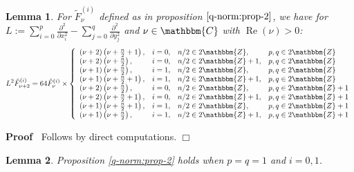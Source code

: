 \documentclass{article}
\newcommand{\assign}{:=}
\newcommand{\tmop}[1]{\ensuremath{\operatorname{#1}}}
\newenvironment{proof}{\noindent\textbf{Proof\ }}{\hspace*{\fill}$\Box$\medskip}
\numberwithin{definition}{section}
\newtheorem{lemma}{Lemma}
\numberwithin{lemma}{section}
\numberwithin{proposition}{section}
{\theorembodyfont{\rmfamily}\newtheorem{remark}{Remark}
\numberwithin{remark}{section}
}
\begin{document}
\begin{lemma}
  \label{lem-normalized-eq}For $\tilde{F}_{\nu}^{( i)}$ defined as in
  proposition $\ref{q-norm:prop-2}$, we have for $L \assign \sum_{i = 0}^p
  \frac{\partial^2}{\partial x_i^2} - \sum_{j = 0}^q
  \frac{\partial^2}{\partial y_j^2}$ and $\nu \in \mathbbm{C}$ with $\tmop{Re}
  ( \nu) > 0$:
  \[ L^2 \tilde{F}_{\nu + 2}^{( i)} = 64 \tilde{F}^{( i)}_{\nu} \times \left\{
     \begin{array}{llll}
       ( \nu + 2) \left( \nu + \frac{n}{2} + 1 \right), & i = 0, & n / 2 \in
       2\mathbbm{Z}, & p, q \in 2\mathbbm{Z}\\
       ( \nu + 2) \left( \nu + \frac{n}{2} \right), & i = 0, & n / 2 \in
       2\mathbbm{Z}+ 1, & p, q \in 2\mathbbm{Z}\\
       ( \nu + 1) \left( \nu + \frac{n}{2} \right), & i = 1, & n / 2 \in
       2\mathbbm{Z}, & p, q \in 2\mathbbm{Z}\\
       ( \nu + 1) \left( \nu + \frac{n}{2} + 1 \right), & i = 1, & n / 2 \in
       2\mathbbm{Z}+ 1, & p, q \in 2\mathbbm{Z}\\
       ( \nu + 2) \left( \nu + \frac{n}{2} \right), & i = 0, & n / 2 \in
       2\mathbbm{Z}, & p, q \in 2\mathbbm{Z}+ 1\\
       ( \nu + 2) \left( \nu + \frac{n}{2} + 1 \right), & i = 0, & n / 2 \in
       2\mathbbm{Z}+ 1, & p, q \in 2\mathbbm{Z}+ 1\\
       ( \nu + 1) \left( \nu + \frac{n}{2} + 1 \right), & i = 1, & n / 2 \in
       2\mathbbm{Z}, & p, q \in 2\mathbbm{Z}+ 1\\
       ( \nu + 1) \left( \nu + \frac{n}{2} \right), & i = 1, & n / 2 \in
       2\mathbbm{Z}+ 1, & p, q \in 2\mathbbm{Z}+ 1
     \end{array} \right. \]
\end{lemma}

\begin{proof}
  Follows by direct computations.
\end{proof}

\begin{lemma}
  \label{lem-r6-e}Proposition \ref{q-norm:prop-2} holds when $p = q = 1$ and
  $i = 0, 1$.
\end{lemma}
\end{document}

